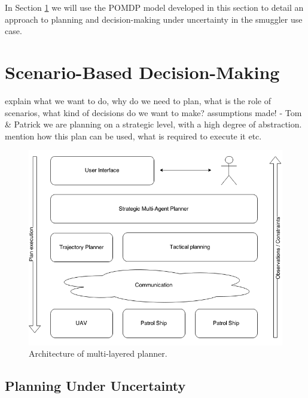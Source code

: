 \documentclass[conference]{IEEEtran}
\begin{document}
In Section \ref{sec:scenario-based-dm} we will use the POMDP model developed in this section to detail an approach to planning and decision-making under uncertainty in the smuggler use case.


\section{Scenario-Based Decision-Making}
\label{sec:scenario-based-dm}

{\red explain what we want to do, why do we need to plan, what is the role of scenarios, what kind of decisions do we want to make? assumptions made! - Tom \& Patrick}
{\red we are planning on a strategic level, with a high degree of abstraction. mention how this plan can be used, what is required to execute it etc.}

\begin{figure}[t]
\begin{center}
 \includegraphics[width=.45\textwidth]{img/planning_archi.png}
 \caption{Architecture of multi-layered planner.}\label{fig:planning-archi}
\end{center}
\end{figure}

\subsection{Planning Under Uncertainty}
\label{sub:plan-uncert}
\end{document}
